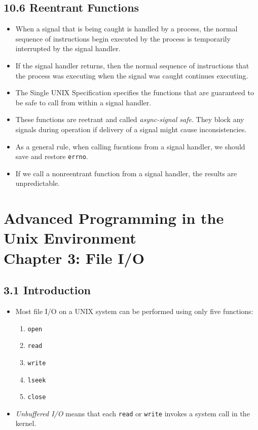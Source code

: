 \documentclass[]{article} \usepackage[all]{xy}
\newcommand{\code}{\texttt}
\begin{document}
\subsection*{10.6 Reentrant Functions}
\begin{itemize}
\item When a signal that is being caught is handled by a process, the normal
sequence of instructions begin executed by the process is temporarily
interrupted by the signal handler.
\item If the signal handler returns, then the normal sequence of instructions
that the process was executing when the signal was caught continues executing.
\item The Single UNIX Specification specifies the functions that are guaranteed
to be safe to call from within a signal handler.
\item These functions are reetrant and called \emph{async-signal safe}. They
block any signals during operation if delivery of a signal might cause
inconsistencies.
\item As a general rule, when calling fucntions from a signal handler, we should
save and restore \code{errno}.
\item If we call a nonreentrant function from a signal handler, the results are
unpredictable.
\end{itemize}

\section*{Advanced Programming in the Unix Environment \\
Chapter 3: File I/O}
\subsection*{3.1 Introduction}
\begin{itemize}
\item Most file I/O on a UNIX system can be performed using only five functions:
\begin{enumerate}
\item \code{open}
\item \code{read}
\item \code{write}
\item \code{lseek}
\item \code{close}
\end{enumerate}
\item \emph{Unbuffered I/O} means that each \code{read} or \code{write} invokes
a system call in the kernel.
\end{itemize}
\end{document}
